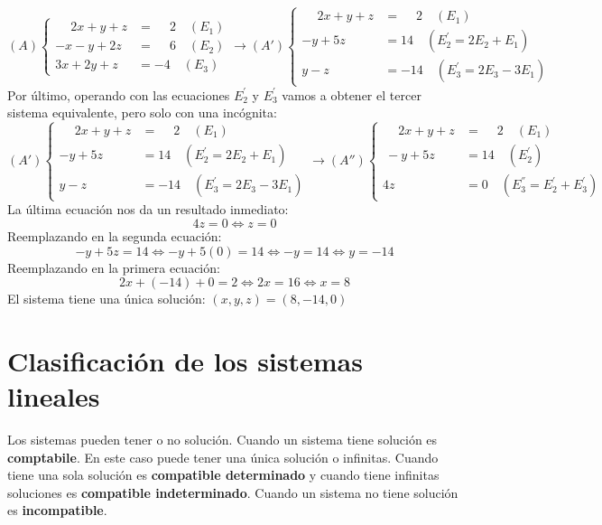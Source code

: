 $$
(A)
\begin{cases}
        \phantom{-}2x + y + z &= \phantom{-}2 \quad (E_1)\\
        -x - y + 2z &= \phantom{-}6 \quad  (E_2)\\
        3x + 2y + z &= -4 \quad  (E_3)
\end{cases}
\rightarrow
(A')
\begin{cases}
    \phantom{-}2x + y + z &= \phantom{-}2 \quad (E_1)\\
    - y + 5z &= 14 \quad  (E^'_2 = 2E_2 + E_1)\\
    y - z &= -14 \quad  (E^'_3 = 2E_3 -3E_1)
\end{cases}
$$
Por último, operando con las ecuaciones $E^'_2$ y $E^'_3$ vamos a obtener el tercer sistema equivalente, pero solo con una incógnita:
$$
(A') 
\begin{cases}
    \phantom{-}2x + y + z &= \phantom{-}2 \quad (E_1)\\
    - y + 5z &= 14 \quad  (E^'_2 = 2E_2 + E_1)\\
    y - z &= -14 \quad  (E^'_3 = 2E_3 -3E_1)
\end{cases}
\rightarrow
(A'')
\begin{cases}
    \phantom{-}2x + y + z &= \phantom{-}2 \quad (E_1)\\
    \ - y + 5z &= 14 \quad  (E^'_2)\\
    4z &= 0 \quad  (E^{''}_3 = E^'_2 + E^'_3)
\end{cases}
$$
La última ecuación nos da un resultado inmediato:
$$
4z = 0 \Leftrightarrow \boxed{z = 0}
$$
Reemplazando en la segunda ecuación:
$$
- y + 5z = 14 \Leftrightarrow - y + 5(0) = 14 \Leftrightarrow - y = 14 \Leftrightarrow \boxed{y = -14}
$$
Reemplazando en la primera ecuación:
$$
2x + (-14) + 0 = 2 \Leftrightarrow 2x = 16 \Leftrightarrow \boxed{x = 8}
$$
El sistema tiene una única solución: $(x, y, z) = (8, -14, 0)$

\section{Clasificación de los sistemas lineales}
Los sistemas pueden tener o no solución. Cuando un sistema tiene solución es \textbf{comptabile}. En este caso puede tener una única solución o infinitas. Cuando tiene una sola solución es \textbf{compatible determinado} y cuando tiene infinitas soluciones es \textbf{compatible indeterminado}. Cuando un sistema no tiene solución es \textbf{incompatible}.
